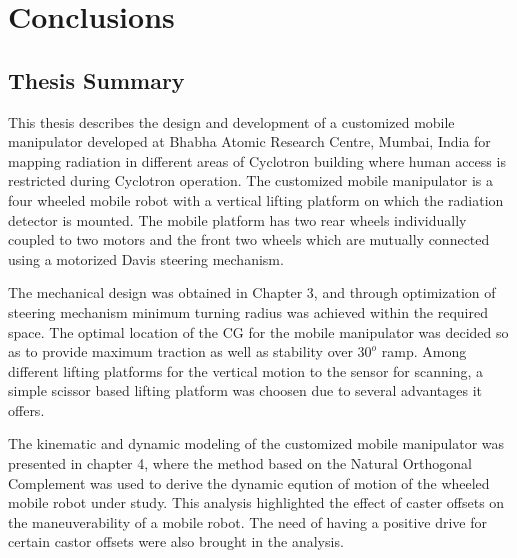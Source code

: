 \chapter{Conclusions}
\label{ch_8:Con}
\section{Thesis Summary}
This thesis describes the design and development of a customized mobile manipulator developed at Bhabha Atomic Research Centre, Mumbai, India  for mapping radiation in different areas of Cyclotron building where human access is restricted during Cyclotron operation. The customized mobile manipulator is a four wheeled mobile robot with a vertical lifting platform on which the radiation detector is mounted. The mobile platform has two rear wheels individually  coupled to   two motors and the front two wheels which are mutually connected using a motorized Davis steering mechanism.


The mechanical design was obtained in Chapter 3,  and through optimization  of steering mechanism minimum turning  radius was achieved  within the required space. The optimal location of the CG for  the mobile manipulator was decided so as to provide maximum traction as well as  stability over $30^o$ ramp.  Among  different lifting platforms for the  vertical motion to the sensor for scanning, a simple scissor based lifting platform was choosen due to several advantages it offers. 

The kinematic and dynamic modeling of the customized mobile manipulator was presented in chapter 4, where the method based on the  Natural Orthogonal Complement was used to derive the dynamic eqution of motion of the wheeled mobile robot under study. This analysis highlighted the  effect of caster  offsets on the maneuverability of a mobile robot. The need of having a positive drive for certain castor offsets were also brought in the analysis. 


